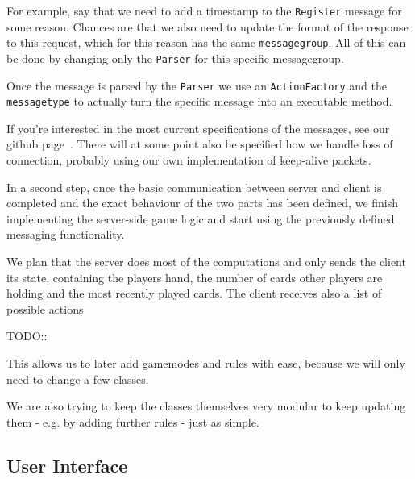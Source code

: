 \documentclass{sig-alternate}
\begin{document}
For example, say that we need to add a timestamp to the \verb|Register| message for some reason. Chances are that we also need to update the format of the response to this request, which for this reason has the same \verb|messagegroup|. All of this can be done by changing only the \verb|Parser| for this specific messagegroup.

Once the message is parsed by the \verb|Parser| we use an \verb|ActionFactory| and the \verb|messagetype| to actually turn the specific message into an executable method.

If you're interested in the most current specifications of the messages, see our github page~\cite{github}. There will at some point also be specified how we handle loss of connection, probably using our own implementation of keep-alive packets.

In a second step, once the basic communication between server and client is completed and the exact behaviour of the two parts has been defined, we finish implementing the server-side game logic and start using the previously defined messaging functionality.

We plan that the server does most of the computations and only sends the client its state, containing the players hand, the number of cards other players are holding and the most recently played cards. The client receives also a list of possible actions


TODO::


This allows us to later add gamemodes and rules with ease, because we will only need to change a few classes.

We are also trying to keep the classes themselves very modular to keep updating them - e.g. by adding further rules - just as simple.

\subsection{User Interface}
\end{document}
